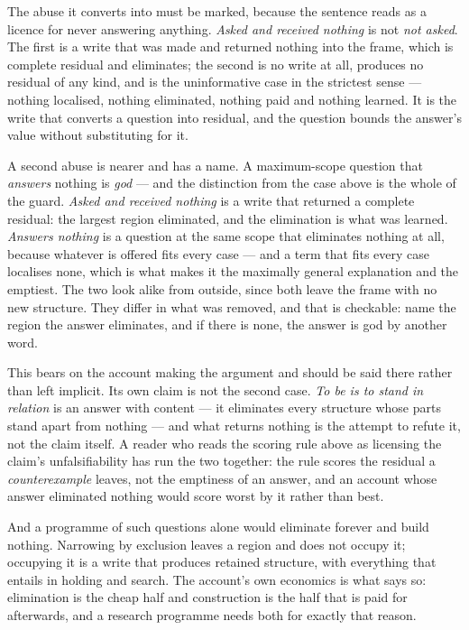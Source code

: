 \documentclass[11pt,a4paper]{article}
\begin{document}
The abuse it converts into must be marked, because the sentence reads as a licence for never answering
anything. \emph{Asked and received nothing} is not \emph{not asked}. The first is a write that was made
and returned nothing into the frame, which is complete residual and eliminates; the second is no write
at all, produces no residual of any kind, and is the uninformative case in the strictest sense ---
nothing localised, nothing eliminated, nothing paid and nothing learned. It is the write that converts
a question into residual, and the question bounds the answer's value without substituting for it.

A second abuse is nearer and has a name. A maximum-scope question that \emph{answers} nothing is
\emph{god} --- and the distinction from the case above is the whole of the guard. \emph{Asked and
received nothing} is a write that returned a complete residual: the largest region eliminated, and the
elimination is what was learned. \emph{Answers nothing} is a question at the same scope that eliminates
nothing at all, because whatever is offered fits every case --- and a term that fits every case
localises none, which is what makes it the maximally general explanation and the emptiest. The two look
alike from outside, since both leave the frame with no new structure. They differ in what was removed,
and that is checkable: name the region the answer eliminates, and if there is none, the answer is
god by another word.

This bears on the account making the argument and should be said there rather than left implicit. Its
own claim is not the second case. \emph{To be is to stand in relation} is an answer with content ---
it eliminates every structure whose parts stand apart from nothing --- and what returns nothing is the
attempt to refute it, not the claim itself. A reader who reads the scoring rule above as licensing the
claim's unfalsifiability has run the two together: the rule scores the residual a \emph{counterexample}
leaves, not the emptiness of an answer, and an account whose answer eliminated nothing would score
worst by it rather than best.

And a programme of such questions alone would eliminate forever and build nothing. Narrowing by
exclusion leaves a region and does not occupy it; occupying it is a write that produces retained
structure, with everything that entails in holding and search. The account's own economics is what says
so: elimination is the cheap half and construction is the half that is paid for afterwards, and a
research programme needs both for exactly that reason.
\end{document}
